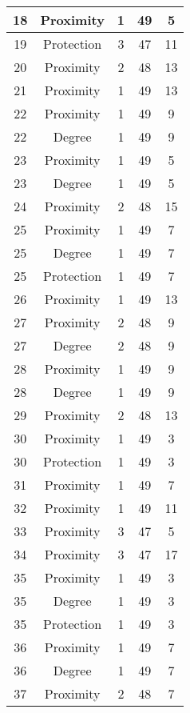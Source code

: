 \documentclass[results.tex]{subfiles}
\begin{document}
\begin{center}
\begin{tabular}{| c || c | c | c | c |}
    \hline
    18 & Proximity & 1 & 49 & 5 \\ 
    \hline
    19 & Protection & 3 & 47 & 11 \\ 
    \hline
    20 & Proximity & 2 & 48 & 13 \\ 
    \hline
    21 & Proximity & 1 & 49 & 13 \\ 
    \hline
    22 & Proximity & 1 & 49 & 9 \\ 
    \hline
    22 & Degree & 1 & 49 & 9 \\ 
    \hline
    23 & Proximity & 1 & 49 & 5 \\ 
    \hline
    23 & Degree & 1 & 49 & 5 \\ 
    \hline
    24 & Proximity & 2 & 48 & 15 \\ 
    \hline
    25 & Proximity & 1 & 49 & 7 \\ 
    \hline
    25 & Degree & 1 & 49 & 7 \\ 
    \hline
    25 & Protection & 1 & 49 & 7 \\ 
    \hline
    26 & Proximity & 1 & 49 & 13 \\ 
    \hline
    27 & Proximity & 2 & 48 & 9 \\ 
    \hline
    27 & Degree & 2 & 48 & 9 \\ 
    \hline
    28 & Proximity & 1 & 49 & 9 \\ 
    \hline
    28 & Degree & 1 & 49 & 9 \\ 
    \hline
    29 & Proximity & 2 & 48 & 13 \\ 
    \hline
    30 & Proximity & 1 & 49 & 3 \\ 
    \hline
    30 & Protection & 1 & 49 & 3 \\ 
    \hline
    31 & Proximity & 1 & 49 & 7 \\ 
    \hline
    32 & Proximity & 1 & 49 & 11 \\ 
    \hline
    33 & Proximity & 3 & 47 & 5 \\ 
    \hline
    34 & Proximity & 3 & 47 & 17 \\ 
    \hline
    35 & Proximity & 1 & 49 & 3 \\ 
    \hline
    35 & Degree & 1 & 49 & 3 \\ 
    \hline
    35 & Protection & 1 & 49 & 3 \\ 
    \hline
    36 & Proximity & 1 & 49 & 7 \\ 
    \hline
    36 & Degree & 1 & 49 & 7 \\ 
    \hline
    37 & Proximity & 2 & 48 & 7 \\ 

\end{tabular}
\end{center}
\end{document}
